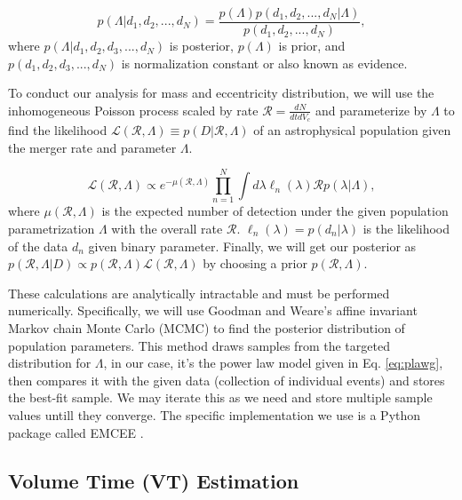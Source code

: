 \documentclass[twocolumn,prd,nofootinbib]{revtex4}
\begin{document}
\begin{equation}
\label{eq:Bayes}    
p(\Lambda|d_1,d_2,...,d_N)= \frac{p(\Lambda)p(d_1,d_2,...,d_N|\Lambda)}{p(d_1,d_2,...,d_N)},
\end{equation}
%
where $p(\Lambda|d_1,d_2,d_3,...,d_N)$ is posterior, $p(\Lambda)$ is prior, and $p(d_1,d_2,d_3,...,d_N)$ is normalization constant or also known as evidence.

To conduct our analysis for mass and eccentricity distribution, we will use the inhomogeneous Poisson process scaled by rate $\mathcal{R} = \frac{dN}{dtdV_c}$ and parameterize by $\Lambda$ to find the likelihood  $\mathcal{L}(\mathcal{R},\Lambda)\equiv p(D|\mathcal{R},\Lambda)$ of an astrophysical population given the merger rate and parameter $\Lambda$. 

\begin{equation}
\label{eq: likelihood}
\mathcal{L}(\mathcal{R},\Lambda) \propto e^{-\mu(\mathcal{R},\Lambda)}\prod_{n=1}^N\int d\lambda \ell_n(\lambda) \mathcal{R} p(\lambda|\Lambda),
\end{equation}
%
where $\mu(\mathcal{R},\Lambda)$ is the expected number of detection under the given population parametrization $\Lambda$ with the overall rate $\mathcal{R}$. $\ell_n(\lambda)=p(d_n|\lambda)$ is the likelihood of the data $d_n$ given binary parameter.
Finally, we will get our posterior as $p(\mathcal{R},\Lambda | D)\propto p(\mathcal{R},\Lambda)  \mathcal{L}(\mathcal{R},\Lambda)$ by choosing a prior $p(\mathcal{R},\Lambda)$.

These calculations are analytically intractable and must be performed numerically. Specifically, we will use Goodman and Weare's affine invariant Markov chain Monte Carlo (MCMC) \cite{mcmc_paper} to find the posterior distribution of population parameters. This method draws samples from the targeted distribution for $\Lambda$, in our case, it's the power law model given in Eq. \ref{eq:plawg}, then compares it with the given data (collection of individual events) and stores the best-fit sample. We may iterate this as we need and store multiple sample values untill they converge. 
The specific implementation we use is a Python package called EMCEE \cite{emcee_paper}.


\subsection{Volume Time (VT) Estimation}
\end{document}
